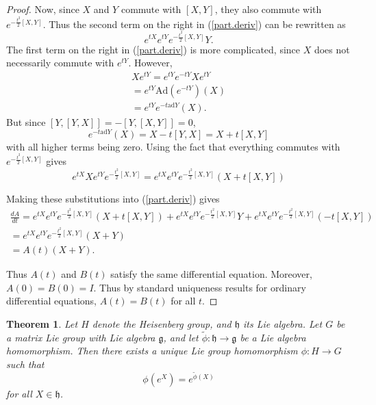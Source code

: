 \documentclass[12pt]{amsbook}
\let \frak = \mathfrak
\theoremstyle{plain}
\newtheorem{theorem}{Theorem}
\numberwithin{equation}{chapter}
\numberwithin{theorem}{chapter}
\begin{document}
\begin{proof}
Now, since $X$ and $Y$ commute with $\left[  X,Y\right]  $, they also commute
with $e^{-\frac{t^{2}}{2}\left[  X,Y\right]  }$. Thus the second term on the
right in (\ref{part.deriv}) can be rewritten as
\[
e^{tX}e^{tY}e^{-\frac{t^{2}}{2}\left[  X,Y\right]  }Y\text{.}%
\]
The first term on the right in (\ref{part.deriv}) is more complicated, since
$X$ does not necessarily commute with $e^{tY}$. However,
\begin{align*}
Xe^{tY}=e^{tY}e^{-tY}Xe^{tY}\\
=e^{tY}\mathrm{Ad}\left(  e^{-tY}\right)  \left(  X\right)  \\
=e^{tY}e^{-t\mathrm{ad}Y}\left(  X\right)  \text{.}%
\end{align*}
But since $\left[  Y,\left[  Y,X\right]  \right]  =-\left[  Y,\left[
X,Y\right]  \right]  =0$,
\[
e^{-t\mathrm{ad}Y}\left(  X\right)  =X-t\left[  Y,X\right]  =X+t\left[
X,Y\right]
\]
with all higher terms being zero. Using the fact that everything commutes with
$e^{-\frac{t^{2}}{2}\left[  X,Y\right]  }$ gives
\[
e^{tX}Xe^{tY}e^{-\frac{t^{2}}{2}\left[  X,Y\right]  }=e^{tX}e^{tY}%
e^{-\frac{t^{2}}{2}\left[  X,Y\right]  }\left(  X+t\left[  X,Y\right]
\right)
\]

Making these substitutions into (\ref{part.deriv}) gives
\begin{align*}
\frac{dA}{dt}=e^{tX}e^{tY}e^{-\frac{t^{2}}{2}\left[  X,Y\right]  }\left(
X+t\left[  X,Y\right]  \right)  +e^{tX}e^{tY}e^{-\frac{t^{2}}{2}\left[
X,Y\right]  }Y+e^{tX}e^{tY}e^{-\frac{t^{2}}{2}\left[  X,Y\right]  }\left(
-t\left[  X,Y\right]  \right)  \\
=e^{tX}e^{tY}e^{-\frac{t^{2}}{2}\left[  X,Y\right]  }\left(  X+Y\right)  \\
=A\left(  t\right)  \left(  X+Y\right)  \text{.}%
\end{align*}

Thus $A\left(  t\right)  $ and $B\left(  t\right)  $ satisfy the same
differential equation. Moreover, $A\left(  0\right)  =B\left(  0\right)  =I$.
Thus by standard uniqueness results for ordinary differential equations,
$A\left(  t\right)  =B\left(  t\right)  $ for all $t$.
\end{proof}

\begin{theorem}
Let $H$ denote the Heisenberg group, and $\frak{h}$ its Lie algebra. Let $G$
be a matrix Lie group with Lie algebra $\frak{g}$, and let $\widetilde{\phi
}:\frak{h}\rightarrow\frak{g}$ be a Lie algebra homomorphism. Then there
exists a unique Lie group homomorphism $\phi:H\rightarrow G$ such that
\[
\phi\left(  e^{X}\right)  =e^{\widetilde{\phi}\left(  X\right)  }%
\]
for all $X\in\frak{h}$.
\end{theorem}
\end{document}
